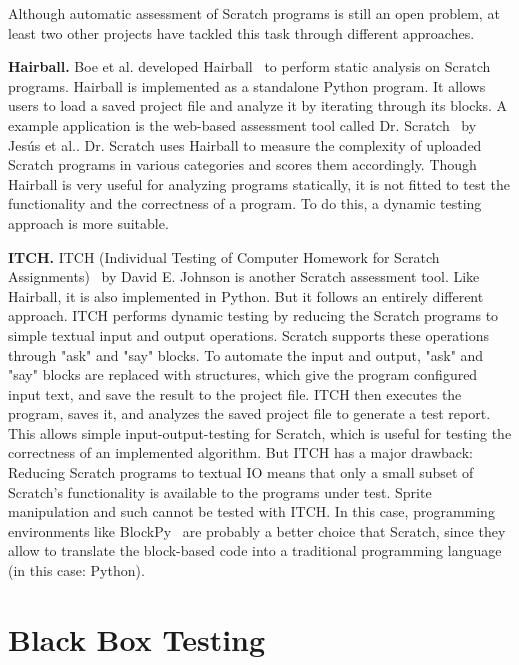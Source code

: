 Although automatic assessment of Scratch programs is still an open problem,
at least two other projects have tackled this task through different approaches.

\textbf{Hairball.}
Boe et al. developed Hairball~\cite{hairball} to perform static analysis on Scratch programs.
Hairball is implemented as a standalone Python program.
It allows users to load a saved project file and analyze it by iterating through its blocks.
A example application is the web-based assessment tool called Dr. Scratch~\cite{drscratch} by Jes\'{u}s et al..
Dr. Scratch uses Hairball to measure the complexity of uploaded Scratch programs in various categories and scores them accordingly.
Though Hairball is very useful for analyzing programs statically, it is not fitted to test the functionality and the correctness of a program.
To do this, a dynamic testing approach is more suitable.

\textbf{ITCH.}
ITCH (Individual Testing of Computer Homework for Scratch Assignments)~\cite{itch} by David E. Johnson is another Scratch assessment tool.
Like Hairball, it is also implemented in Python.
But it follows an entirely different approach.
ITCH performs dynamic testing by reducing the Scratch programs to simple textual input and output operations.
Scratch supports these operations through "ask" and "say" blocks.
To automate the input and output, "ask" and "say" blocks are replaced with structures, which give the program configured input text, and save the result to the project file.
ITCH then executes the program, saves it, and analyzes the saved project file to generate a test report.
This allows simple input-output-testing for Scratch, which is useful for testing the correctness of an implemented algorithm.
But ITCH has a major drawback: Reducing Scratch programs to textual IO means that only a small subset of Scratch's functionality is available to the programs under test.
Sprite manipulation and such cannot be tested with ITCH.
In this case, programming environments like BlockPy~\cite{blockpy} are probably a better choice that Scratch,
since they allow to translate the block-based code into a traditional programming language (in this case: Python).

\section{Black Box Testing}

